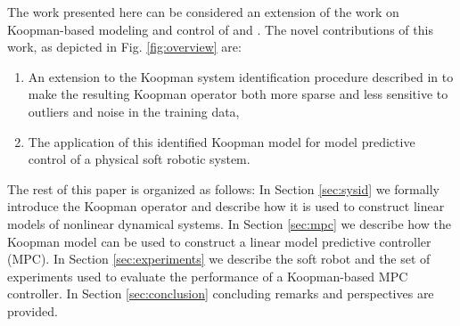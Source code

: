 The work presented here can be considered an extension of the work on Koopman-based modeling and control of \citet{mauroy2016linear} and \citet{korda2018linear}.
The novel contributions of this work, as depicted in Fig. \ref{fig:overview} are:
\begin{enumerate}
    \item An extension to the Koopman system identification procedure described in \cite{mauroy2016linear} to make the resulting Koopman operator both more sparse and less sensitive to outliers and noise in the training data,
    \item The application of this identified Koopman model for model predictive control of a physical soft robotic system.
\end{enumerate}




The rest of this paper is organized as follows:
In Section \ref{sec:sysid} we formally introduce the Koopman operator and describe how it is used to construct linear models of nonlinear dynamical systems. 
In Section \ref{sec:mpc} we describe how the Koopman model can be used to construct a linear model predictive controller (MPC).
In Section \ref{sec:experiments} we describe the soft robot and the set of experiments used to evaluate the performance of a Koopman-based MPC controller.
In Section \ref{sec:conclusion} concluding remarks and perspectives are provided.
